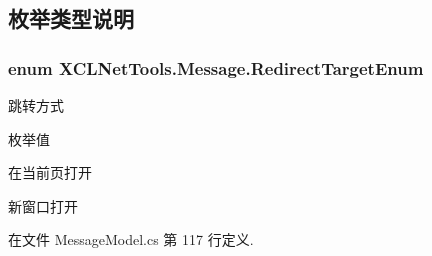 \subsection{枚举类型说明}
\hypertarget{namespace_x_c_l_net_tools_1_1_message_a7f19b509275317a7b01e7dc5cb615095}{
\subsubsection[{Redirect\-Target\-Enum}]{\setlength{\rightskip}{0pt plus 5cm}enum {\bf X\-C\-L\-Net\-Tools.\-Message.\-Redirect\-Target\-Enum}}}\label{namespace_x_c_l_net_tools_1_1_message_a7f19b509275317a7b01e7dc5cb615095}


跳转方式 

\begin{Desc}
\item[枚举值]\par
\begin{description}
\item[{\em 
\hypertarget{namespace_x_c_l_net_tools_1_1_message_a7f19b509275317a7b01e7dc5cb615095a6adf97f83acf6453d4a6a4b1070f3754}{None}\label{namespace_x_c_l_net_tools_1_1_message_a7f19b509275317a7b01e7dc5cb615095a6adf97f83acf6453d4a6a4b1070f3754}
}]在当前页打开 \item[{\em 
\hypertarget{namespace_x_c_l_net_tools_1_1_message_a7f19b509275317a7b01e7dc5cb615095aa9453646c9602d8a4f00d42b7c9844ab}{New\-Blank}\label{namespace_x_c_l_net_tools_1_1_message_a7f19b509275317a7b01e7dc5cb615095aa9453646c9602d8a4f00d42b7c9844ab}
}]新窗口打开 \end{description}
\end{Desc}


在文件 Message\-Model.\-cs 第 117 行定义.

